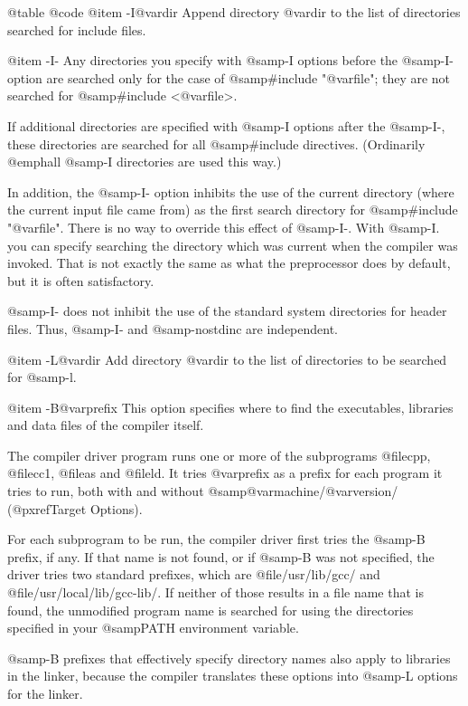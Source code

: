 {{@table @code
@item -I@var{dir}
Append directory @var{dir} to the list of directories searched for
include files.

@item -I-
Any directories you specify with @samp{-I} options before the @samp{-I-}
option are searched only for the case of @samp{#include "@var{file}"};
they are not searched for @samp{#include <@var{file}>}.

If additional directories are specified with @samp{-I} options after
the @samp{-I-}, these directories are searched for all @samp{#include}
directives.  (Ordinarily @emph{all} @samp{-I} directories are used
this way.)

In addition, the @samp{-I-} option inhibits the use of the current
directory (where the current input file came from) as the first search
directory for @samp{#include "@var{file}"}.  There is no way to
override this effect of @samp{-I-}.  With @samp{-I.} you can specify
searching the directory which was current when the compiler was
invoked.  That is not exactly the same as what the preprocessor does
by default, but it is often satisfactory.

@samp{-I-} does not inhibit the use of the standard system directories
for header files.  Thus, @samp{-I-} and @samp{-nostdinc} are
independent.

@item -L@var{dir}
Add directory @var{dir} to the list of directories to be searched
for @samp{-l}.

@item -B@var{prefix}
This option specifies where to find the executables, libraries and
data files of the compiler itself.

The compiler driver program runs one or more of the subprograms
@file{cpp}, @file{cc1}, @file{as} and @file{ld}.  It tries
@var{prefix} as a prefix for each program it tries to run, both with and
without @samp{@var{machine}/@var{version}/} (@pxref{Target Options}).

For each subprogram to be run, the compiler driver first tries the
@samp{-B} prefix, if any.  If that name is not found, or if @samp{-B}
was not specified, the driver tries two standard prefixes, which are
@file{/usr/lib/gcc/} and @file{/usr/local/lib/gcc-lib/}.  If neither of
those results in a file name that is found, the unmodified program
name is searched for using the directories specified in your
@samp{PATH} environment variable.

@samp{-B} prefixes that effectively specify directory names also apply
to libraries in the linker, because the compiler translates these
options into @samp{-L} options for the linker.

}}
